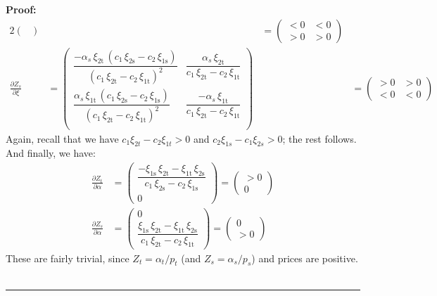\documentclass[11pt,a4paper]{extarticle}
\newenvironment{proof}[1][Proof]{\noindent\textbf{#1:} }{\ \rule{0.5em}{0.5em}}
\begin{document}
\begin{proof}
\begin{alignat*}{2}
\begin{pmatrix}
	\end{pmatrix}
	&&=
	\begin{pmatrix}
	< 0 & < 0  \\
	> 0 & > 0
	\end{pmatrix} \\
	\frac{\partial Z_s}{\partial \xi} &= 
	\begin{pmatrix}
	\dfrac{-\alpha _{s}\,\xi _{\mathrm{2t}}\,\left(c_{1}\,\xi _{\mathrm{2s}}-c_{2}\,\xi _{\mathrm{1s}}\right)}{{\left(c_{1}\,\xi _{\mathrm{2t}}-c_{2}\,\xi _{\mathrm{1t}}\right)}^2}& \dfrac{\alpha _{s}\,\xi _{\mathrm{2t}}}{c_{1}\,\xi _{\mathrm{2t}}-c_{2}\,\xi _{\mathrm{1t}}}\\
	\dfrac{\alpha _{s}\,\xi _{\mathrm{1t}}\,\left(c_{1}\,\xi _{\mathrm{2s}}-c_{2}\,\xi _{\mathrm{1s}}\right)}{{\left(c_{1}\,\xi _{\mathrm{2t}}-c_{2}\,\xi _{\mathrm{1t}}\right)}^2} & \dfrac{-\alpha _{s}\,\xi _{\mathrm{1t}}}{c_{1}\,\xi _{\mathrm{2t}}-c_{2}\,\xi _{\mathrm{1t}}}\\
	\end{pmatrix}
	&&=
	\begin{pmatrix}
	> 0 & > 0 \\
	< 0 & < 0  
	\end{pmatrix}
	\end{alignat*}
	Again, recall that we have $c_1 \xi_{2t} - c_2 \xi_{1t} > 0$ and $c_2 \xi_{1s} - c_1 \xi_{2s} > 0$; the rest follows. And finally, we have:
	\begin{align*}
	\frac{\partial Z_t}{\partial \alpha} &= 
	\begin{pmatrix}
	\dfrac{-\xi _{\mathrm{1s}}\,\xi _{\mathrm{2t}}-\xi _{\mathrm{1t}}\,\xi _{\mathrm{2s}}}{c_{1}\,\xi _{\mathrm{2s}}-c_{2}\,\xi _{\mathrm{1s}}} \\
	0
	\end{pmatrix}
	=
	\begin{pmatrix}
	> 0 \\
	0 
	\end{pmatrix} \\
	\frac{\partial Z_s}{\partial \alpha} &= 
	\begin{pmatrix}
	0 \\
	\dfrac{\xi _{\mathrm{1s}}\,\xi _{\mathrm{2t}}-\xi _{\mathrm{1t}}\,\xi _{\mathrm{2s}}}{c_{1}\,\xi _{\mathrm{2t}}-c_{2}\,\xi _{\mathrm{1t}}}
	\end{pmatrix}
	=
	\begin{pmatrix}
	0 \\
	> 0 
	\end{pmatrix}
	\end{align*}
	These are fairly trivial, since $Z_t = \alpha_t / p_t$ (and $Z_s = \alpha_s/ p_s$) and prices are positive. \\
	\hfill
\end{proof}
\end{document}
